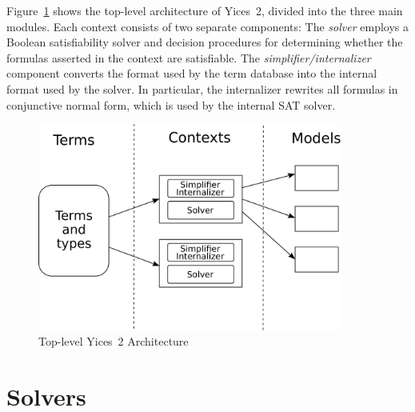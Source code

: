 \documentclass[11pt,twoside,fleqn,openright,titlepage]{cslreport}
\begin{document}
Figure~\ref{top-level-architecture}  shows the  top-level architecture
of Yices~2, divided into the three main modules. Each context consists
of  two separate  components:  The {\em  solver\/}  employs a  Boolean
satisfiability solver and  decision procedures for determining whether
the   formulas  asserted   in  the   context  are   satisfiable.   The
\emph{simplifier/internalizer\/} component converts the format used by
the term  database into  the internal format  used by the  solver.  In
particular,  the  internalizer rewrites  all  formulas in  conjunctive
normal form, which is used by the internal SAT solver.
\begin{figure}
\begin{center}
\includegraphics[width=10cm]{toplevel-arch}
\end{center}
\caption{Top-level Yices~2 Architecture}
\label{top-level-architecture}
\end{figure}


\section{Solvers}
\label{solvers}
\end{document}
